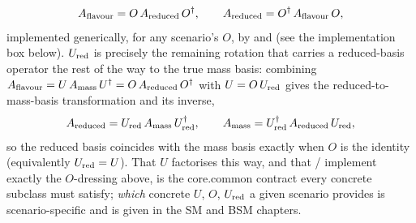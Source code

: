 \begin{theorybox}
\begin{equation}
  A_{\rm flavour} = O\,A_{\rm reduced}\,O^\dagger,
  \qquad
  A_{\rm reduced} = O^\dagger\,A_{\rm flavour}\,O,
\end{equation}
implemented generically, for any scenario's $O$, by 
and  (see the implementation box below). $U_{\rm
red}$ is precisely the remaining rotation that carries a reduced-basis
operator the rest of the way to the true mass basis: combining
$A_{\rm flavour}=U\,A_{\rm mass}\,U^\dagger=O\,A_{\rm reduced}\,O^\dagger$
with $U=O\,U_{\rm red}$ gives the reduced-to-mass-basis transformation and
its inverse,
\begin{equation}
  A_{\rm reduced} = U_{\rm red}\,A_{\rm mass}\,U_{\rm red}^\dagger,
  \qquad
  A_{\rm mass} = U_{\rm red}^\dagger\,A_{\rm reduced}\,U_{\rm red},
\end{equation}
so the reduced basis coincides with the mass basis exactly when $O$ is the
identity (equivalently $U_{\rm red}=U$).
That $U$ factorises this way, and that /%
 implement exactly the $O$-dressing above, is the
core.common contract every concrete  subclass must satisfy;
\emph{which} concrete $U$, $O$, $U_{\rm red}$ a given scenario provides is
scenario-specific and is given in the SM and BSM chapters.


\end{theorybox}
